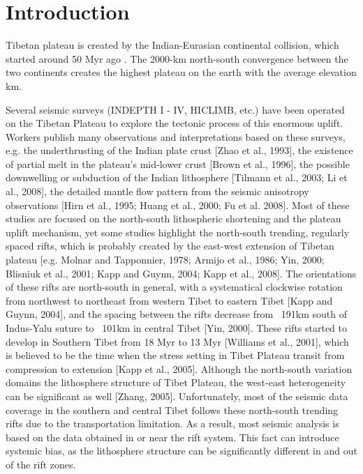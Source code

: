 \section{Introduction}

Tibetan plateau is created by the Indian-Eurasian continental collision, which started around 50 Myr ago \cite{Patriat_1984}. The 2000-km north-south convergence between the two continents creates the highest plateau on the earth with the average elevation  km.



Several seismic surveys (INDEPTH I - IV, HICLIMB, etc.) have been operated on the Tibetan Plateau to explore the tectonic process of this enormous uplift. Workers publish many observations and interpretations based on these surveys, e.g. the underthrusting of the Indian plate crust [Zhao et al., 1993], the existence of partial melt in the plateau’s mid-lower crust [Brown et al., 1996], the possible downwelling or subduction of the Indian lithosphere [Tilmann et al., 2003; Li et al., 2008], the detailed mantle flow pattern from the seismic anisotropy observations [Hirn et al., 1995; Huang et al., 2000; Fu et al. 2008].
Most of these studies are focused on the north-south lithospheric shortening and the plateau uplift mechanism, yet some studies highlight the north-south trending, regularly spaced rifts, which is probably created by the east-west extension of Tibetan plateau [e.g. Molnar and Tapponnier, 1978; Armijo et al., 1986; Yin, 2000; Blisniuk et al., 2001; Kapp and Guynn, 2004; Kapp et al., 2008]. The orientations of these rifts are north-south in general, with a systematical clockwise rotation from northwest to northeast from western Tibet to eastern Tibet [Kapp and Guynn, 2004], and the spacing between the rifts decrease from ~191km south of Indus-Yalu suture to ~101km in central Tibet [Yin, 2000]. These rifts started to develop in Southern Tibet from 18 Myr to 13 Myr [Williams et al., 2001], which is believed to be the time when the stress setting in Tibet Plateau transit from compression to extension [Kapp et al., 2005]. 
Although the north-south variation domains the lithosphere structure of Tibet Plateau, the west-east heterogeneity can be significant as well [Zhang, 2005]. Unfortunately, most of the seismic data coverage in the southern and central Tibet follows these north-south trending rifts due to the transportation limitation. As a result, most seismic analysis is based on the data obtained in or near the rift system. This fact can introduce systemic bias, as the lithosphere structure can be significantly different in and out of the rift zones.
